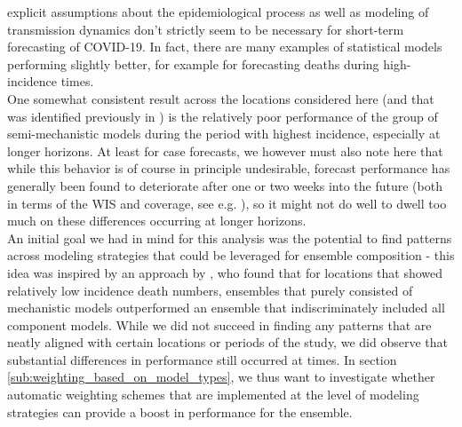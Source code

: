explicit assumptions about the epidemiological process as well as modeling of transmission dynamics don't strictly seem to be necessary for short-term forecasting of COVID-19. In fact, there are many examples of statistical models performing slightly better, for example for forecasting deaths during high-incidence times.\\ 
One somewhat consistent result across the locations considered here (and that was identified previously in \cite{bracher_evaluating_2021}) is the relatively poor performance of the group of semi-mechanistic models during the period with highest incidence, especially at longer horizons. At least for case forecasts, we however must also note here that while this behavior is of course in principle undesirable, forecast performance has generally been found to deteriorate after one or two weeks into the future (both in terms of the WIS and coverage, see e.g. \cite{sherratt_european_2022}), so it might not do well to dwell too much on these differences occurring at longer horizons.\\
An initial goal we had in mind for this analysis was the potential to find patterns across modeling strategies that could be leveraged for ensemble composition - this idea was inspired by an approach by \cite{taylor_combining_2021}, who found that for locations that showed relatively low incidence death numbers, ensembles that purely consisted of mechanistic models outperformed an ensemble that indiscriminately included all component models. While we did not succeed in finding any patterns that are neatly aligned with certain locations or periods of the study, we did observe that substantial differences in performance still occurred at times. In section \ref{sub:weighting_based_on_model_types}, we thus want to investigate whether automatic weighting schemes that are implemented at the level of modeling strategies can provide a boost in performance for the ensemble.
